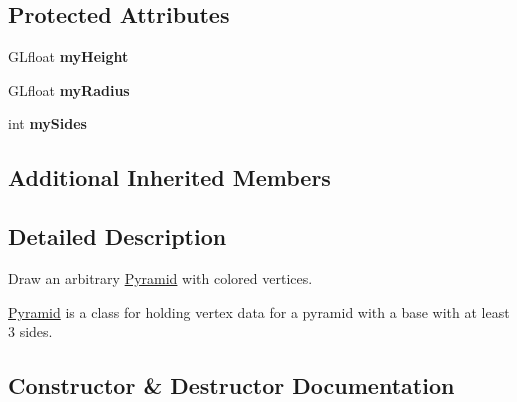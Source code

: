 \subsection*{Protected Attributes}
\begin{DoxyCompactItemize}
\item 
\mbox{\label{classtsgl_1_1_pyramid_ae413ddfe4c3adb247b046c6322c569da}} 
G\+Lfloat {\bfseries my\+Height}
\item 
\mbox{\label{classtsgl_1_1_pyramid_a290d3c2312d62f4573e4bd6aff3a8b00}} 
G\+Lfloat {\bfseries my\+Radius}
\item 
\mbox{\label{classtsgl_1_1_pyramid_a5c4f2b3063e23ae0492b6e00e8d9100a}} 
int {\bfseries my\+Sides}
\end{DoxyCompactItemize}
\subsection*{Additional Inherited Members}


\subsection{Detailed Description}
Draw an arbitrary \hyperlink{classtsgl_1_1_pyramid}{Pyramid} with colored vertices. 

\hyperlink{classtsgl_1_1_pyramid}{Pyramid} is a class for holding vertex data for a pyramid with a base with at least 3 sides. 

\subsection{Constructor \& Destructor Documentation}
\mbox{\label{classtsgl_1_1_pyramid_ad980b2565031617f41a89d62a85f4c85}} 
